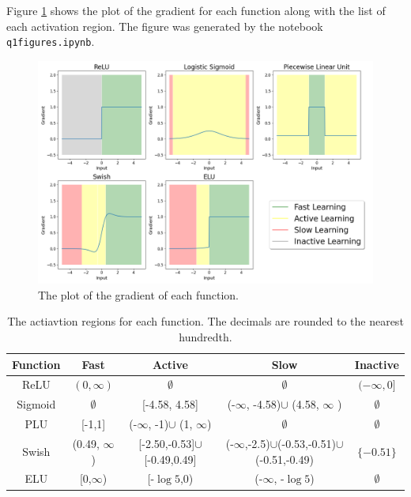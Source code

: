\documentclass[
	12pt, %
]{../Template/fphw}
\begin{document}
Figure \ref{fig:gradients_q1} shows the plot of the gradient for each function along with the list of each activation region. The figure was generated by the notebook \verb|q1figures.ipynb|.

\begin{figure}[!htbp]
    \centering
    \includegraphics[width=18cm]{HW1/gradient_plot_q1.png}
    \caption{The plot of the gradient of each function.}
    \label{fig:gradients_q1}
\end{figure}

\begin{table}[!htbp]
    \centering
    \begin{tabular}{|c||c|c|c|c|}
        \hline
         Function & Fast  & Active  & Slow & Inactive \\
         \hline
         ReLU & $(0,\infty)$ & $\emptyset$  & $\emptyset$ & $(-\infty,0]$\\
         \hline
         Sigmoid & $\emptyset$ & [-4.58, 4.58]  & (-$\infty$, -4.58)$\cup$ (4.58, $\infty$ ) & $\emptyset$\\
         \hline
         PLU & [-1,1] & (-$\infty$, -1)$\cup$ (1, $\infty$)  & $\emptyset$ & $\emptyset$\\
         \hline
         Swish & (0.49, $\infty$) &  [-2.50,-0.53]$\cup$ [-0.49,0.49] & (-$\infty$,-2.5)$\cup$(-0.53,-0.51)$\cup$(-0.51,-0.49) & $\{-0.51\}$\\
         \hline
         ELU & [0,$\infty$) & [-$\log{5}$,0)  & (-$\infty$, -$\log{5}$) & $\emptyset$\\
         \hline
    \end{tabular}
    \caption{The actiavtion regions for each function. The decimals are rounded to the nearest hundredth.}
    \label{tab:q1}
\end{table}
\end{document}
